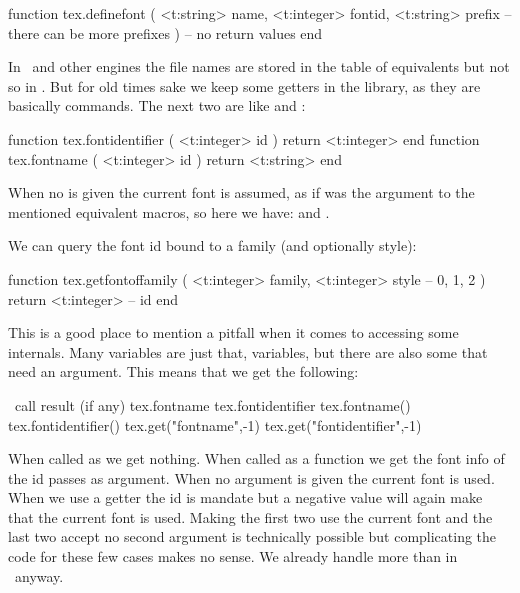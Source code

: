 \starttyping[option=LUA]
function tex.definefont (
    <t:string>  name,
    <t:integer> fontid,
    <t:string>  prefix
 -- there can be more prefixes
)
    -- no return values
end
\stoptyping

In \LUATEX\ and other engines the file names are stored in the table of
equivalents but not so in \LUAMETATEX. But for old times sake we keep some
getters in the  library, as they are basically 
commands. The next two are like \type {\fontid} and \type {\fontname}:

\starttyping[option=LUA]
function tex.fontidentifier ( <t:integer> id ) return <t:integer> end
function tex.fontname       ( <t:integer> id ) return <t:string>  end
\stoptyping

When no  is given the current font is assumed, as if \type {\font} was
the argument to the mentioned equivalent macros, so here we have: {\tttf
{}} and {\tttf {}}.

We can query the font id bound to a family (and optionally style):

\starttyping[option=LUA]
function tex.getfontoffamily (
    <t:integer> family,
    <t:integer> style   -- 0, 1, 2
)
     return <t:integer> -- id
end
\stoptyping

This is a good place to mention a pitfall when it comes to accessing some
internals. Many variables are just that, variables, but there are also some that
need an argument. This means that we get the following:

\starttabulate[|lT|lT|]
\FL
\BC \LUA\ call                   \BC result (if any)                            \NC \NR
\TL
\NC tex.fontname                 \NC {}                \NC \NR
\NC tex.fontidentifier           \NC {}          \NC \NR
\NC tex.fontname()               \NC {}              \NC \NR
\NC tex.fontidentifier()         \NC {}        \NC \NR
\NC tex.get("fontname",-1)       \NC {}       \NC \NR
\NC tex.get("fontidentifier",-1) \NC {} \NC \NR
\LL
\stoptabulate

When called as  we get nothing. When called as a function we get
the font info of the id passes as argument. When no argument is given the current
font is used. When we use a getter the id is mandate but a negative value will
again make that the current font is used. Making the first two use the current
font and the last two accept no second argument is technically possible but
complicating the code for these few cases makes no sense. We already handle more
than in \LUATEX\ anyway.

